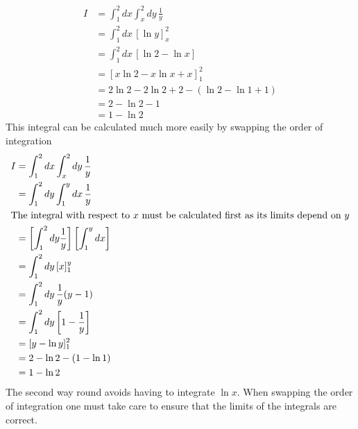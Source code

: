 \documentclass{article}
\begin{document}
    \example
    \begin{align*}
        I &= \int_1^2 dx\int_x^2 dy\,\frac{1}{y}\\
        &= \int_1^2 dx\,[\ln y]_x^2\\
        &= \int_1^2 dx\,[\ln 2 - \ln x]\\
        &= [x\ln 2 - x\ln x + x]_1^2\\
        &= 2\ln 2 - 2\ln 2 + 2 - (\ln 2 - \ln 1 + 1)\\
        &= 2 - \ln 2 - 1\\
        &= 1 - \ln 2
    \end{align*}
    This integral can be calculated much more easily by swapping the order of integration
    \begin{align*}
        I &= \int_1^2 dx\int_x^2 dy\,\frac{1}{y}\\
        &= \int_1^2 dy\int_1^y dx\, \frac{1}{y}\\
        \intertext{The integral with respect to \(x\) must be calculated first as its limits depend on \(y\)}
        &= \left[\int_1^2 dy\frac{1}{y} \right]\left[ \int_1^y dx\right]\\
        &= \int_1^2 dy\,[x]_1^y\\
        &= \int_1^2 dy\,\frac{1}{y}(y - 1)\\
        &= \int_1^2 dy \left[1 - \frac{1}{y}\right]\\
        &= [y - \ln y]_1^2\\
        &= 2 - \ln 2 - (1 - \ln 1)\\
        &= 1 - \ln 2
    \end{align*}
    The second way round avoids having to integrate \(\ln x\).
    When swapping the order of integration one must take care to ensure that the limits of the integrals are correct.
    
\end{document}
